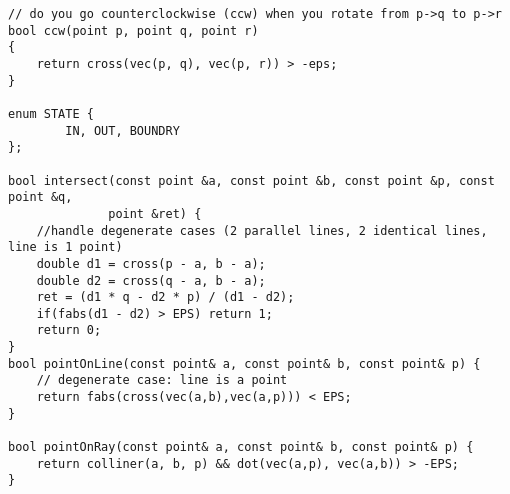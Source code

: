 \documentclass[12pt]{book}
\begin{document}
\begin{verbatim}
// do you go counterclockwise (ccw) when you rotate from p->q to p->r
bool ccw(point p, point q, point r)
{
	return cross(vec(p, q), vec(p, r)) > -eps;
}
	
enum STATE {
        IN, OUT, BOUNDRY
};

bool intersect(const point &a, const point &b, const point &p, const point &q,
              point &ret) {
    //handle degenerate cases (2 parallel lines, 2 identical lines, line is 1 point)    
    double d1 = cross(p - a, b - a);
    double d2 = cross(q - a, b - a);
    ret = (d1 * q - d2 * p) / (d1 - d2);
    if(fabs(d1 - d2) > EPS) return 1;
    return 0;
}
bool pointOnLine(const point& a, const point& b, const point& p) {
    // degenerate case: line is a point
    return fabs(cross(vec(a,b),vec(a,p))) < EPS;
}

bool pointOnRay(const point& a, const point& b, const point& p) {
    return colliner(a, b, p) && dot(vec(a,p), vec(a,b)) > -EPS;
}


\end{verbatim}
\end{document}
